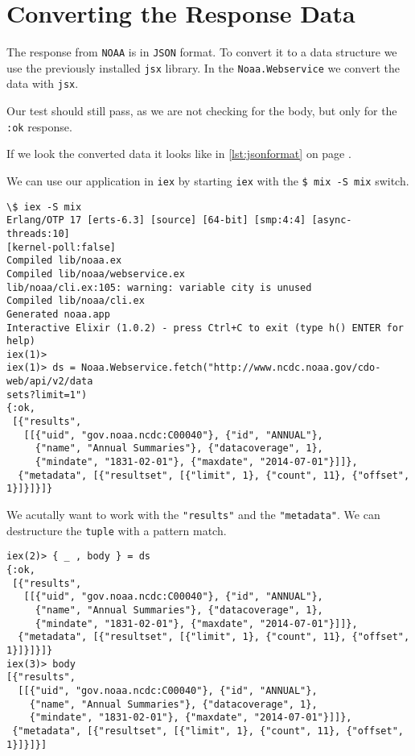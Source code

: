 \documentclass[10pt, a4paper]{article}
\newcommand{\includecode}[3]{}
\begin{document}
\section{Converting the Response Data}
The response from \texttt{NOAA} is in \texttt{JSON} format. To convert it to a
data structure we use the previously installed \texttt{jsx} library. In the
\texttt{Noaa.Webservice} we convert the data with \texttt{jsx}.

\includecode{lib/noaa/webservice.ex}{lst:webservice2}{listings/webservice2.ex}

Our test should still pass, as we are not checking for the body, but only for
the \texttt{:ok} response.

If we look the converted data it looks like in \ref{lst:jsonformat} on page
\pageref{lst:jsonformat}.

\includecode{JSON format of webservice response}{lst:jsonformat}
            {listings/json-format}

We can use our application in \texttt{iex} by starting \texttt{iex} with the
\texttt{\$ mix -S mix} switch.

\begin{verbatim}
\$ iex -S mix
Erlang/OTP 17 [erts-6.3] [source] [64-bit] [smp:4:4] [async-threads:10] 
[kernel-poll:false]
Compiled lib/noaa.ex
Compiled lib/noaa/webservice.ex
lib/noaa/cli.ex:105: warning: variable city is unused
Compiled lib/noaa/cli.ex
Generated noaa.app
Interactive Elixir (1.0.2) - press Ctrl+C to exit (type h() ENTER for help)
iex(1)>
iex(1)> ds = Noaa.Webservice.fetch("http://www.ncdc.noaa.gov/cdo-web/api/v2/data
sets?limit=1")
{:ok,
 [{"results",
   [[{"uid", "gov.noaa.ncdc:C00040"}, {"id", "ANNUAL"},
     {"name", "Annual Summaries"}, {"datacoverage", 1},
     {"mindate", "1831-02-01"}, {"maxdate", "2014-07-01"}]]},
  {"metadata", [{"resultset", [{"limit", 1}, {"count", 11}, {"offset", 1}]}]}]}
\end{verbatim}

We acutally want to work with the \texttt{"results"} and the 
\texttt{"metadata"}. We can destructure the \texttt{tuple} with a pattern match.

\begin{verbatim}
iex(2)> { _ , body } = ds
{:ok,
 [{"results",
   [[{"uid", "gov.noaa.ncdc:C00040"}, {"id", "ANNUAL"},
     {"name", "Annual Summaries"}, {"datacoverage", 1},
     {"mindate", "1831-02-01"}, {"maxdate", "2014-07-01"}]]},
  {"metadata", [{"resultset", [{"limit", 1}, {"count", 11}, {"offset", 1}]}]}]}
iex(3)> body
[{"results",
  [[{"uid", "gov.noaa.ncdc:C00040"}, {"id", "ANNUAL"},
    {"name", "Annual Summaries"}, {"datacoverage", 1},
    {"mindate", "1831-02-01"}, {"maxdate", "2014-07-01"}]]},
 {"metadata", [{"resultset", [{"limit", 1}, {"count", 11}, {"offset", 1}]}]}]
\end{verbatim}
\end{document}
